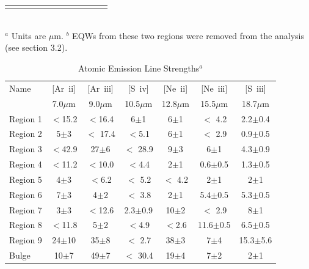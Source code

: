 \documentclass[useAMS,usenatbib,a4paper]{mn2e}
\begin{document}
\begin{table}
\begin{minipage}{200mm}
\begin{tabular}{l c c  c  c  c  c  c  c  c  c c }
\hline
 \label{EQW}
\end{tabular}\\
{$^a$ Units are $\mu$m. $^b$ EQWs from these two regions were removed from the analysis (see section 3.2).}
\end{minipage}
\end{table}






\begin{table}
 \centering
 \begin{minipage}{100mm}
\caption{Atomic Emission Line Strengths$^a$}
  \begin{tabular}{l c c  c  c  c  c  }
  \hline{Name  }&{[Ar~{\sc ii}] }&{[Ar~{\sc iii}]  }&{[S~{\sc iv}]}&{[Ne~{\sc ii}]   }&{[Ne~{\sc iii}]   }&{[S~{\sc iii}]  }\\
{}&{\tiny{7.0$\mu$m} }&{\tiny{9.0$\mu$m }}&{\tiny{10.5$\mu$m}}&{\tiny{12.8$\mu$m  }}&{\tiny{15.5$\mu$m } }&{\tiny{18.7$\mu$m }} 
   \\
 \hline 
 
Region 1 &    $<$15.2                 & $<$16.4                 & 6$\pm$1                 & 6$\pm$1                 & $<$ 4.2                 & 2.2$\pm$0.4                \\
Region 2 &    5$\pm$3                 & $<$ 17.4               & $<$5.1                    & 6$\pm$1                 & $<$ 2.9                 & 0.9$\pm$0.5                 \\
Region 3 &    $<$42.9                 & 27$\pm$6              & $<$ 28.9                & 9$\pm$3                 & 6$\pm$1               & 4.3$\pm$0.9                 \\
Region 4 &    $<$11.2                 & $<$10.0                 & $<$4.4                    & 2$\pm$1                 & 0.6$\pm$0.5        & 1.3$\pm$0.5                 \\
Region 5 &    4$\pm$3                 & $<$6.2                   & $<$ 5.2                 & $<$ 4.2                     & 2$\pm$1               & 2$\pm$1                 \\
Region 6 &    7$\pm$3                & 4$\pm$2                 & $<$ 3.8                 & 2$\pm$1                  & 5.4$\pm$0.5         & 5.3$\pm$0.5                 \\
Region 7 &    3$\pm$3                 & $<$12.6                 & 2.3$\pm$0.9        & 10$\pm$2                & $<$ 2.9                 & 8$\pm$1                \\
Region 8 &    $<$11.8                  & 5$\pm$2                & $<$4.9                  & $<$2.6                       & 11.6$\pm$0.5     & 6.5$\pm$0.5                 \\
Region 9 &    24$\pm$10             & 35$\pm$8             & $<$ 2.7                 & 38$\pm$3                 & 7$\pm$4               & 15.3$\pm$5.6                 \\
Bulge &          10$\pm$7               & 49$\pm$7              & $<$ 30.4               & 19$\pm$4                 & 7$\pm$2               & 2$\pm$1      \\           


\end{tabular}
\end{minipage}
\end{table}
\end{document}
